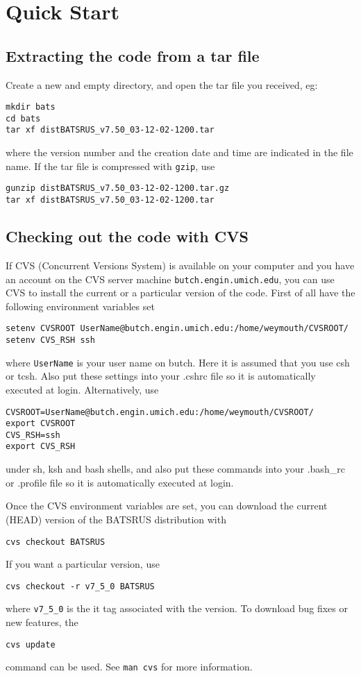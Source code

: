\section{Quick Start \label{section:quick_start}}

\subsection{Extracting the code from a tar file}

Create a new and empty directory, and open the tar file you received, eg:
\begin{verbatim}
mkdir bats
cd bats
tar xf distBATSRUS_v7.50_03-12-02-1200.tar  
\end{verbatim}
where the version number and the creation date and time are indicated
in the file name. If the tar file is compressed with {\tt gzip}, use
\begin{verbatim}
gunzip distBATSRUS_v7.50_03-12-02-1200.tar.gz
tar xf distBATSRUS_v7.50_03-12-02-1200.tar
\end{verbatim}

\subsection{Checking out the code with CVS}

If CVS (Concurrent Versions System) is available on your computer
and you have an account on the CVS server machine 
{\tt butch.engin.umich.edu}, you can use CVS to install
the current or a particular version of the code.
First of all have the following environment variables set
\begin{verbatim}
setenv CVSROOT UserName@butch.engin.umich.edu:/home/weymouth/CVSROOT/
setenv CVS_RSH ssh
\end{verbatim}
where {\tt UserName} is your user name on butch. Here it is assumed
that you use csh or tcsh. Also put these settings into your .cshrc file
so it is automatically executed at login. Alternatively, use
\begin{verbatim}
CVSROOT=UserName@butch.engin.umich.edu:/home/weymouth/CVSROOT/
export CVSROOT
CVS_RSH=ssh
export CVS_RSH
\end{verbatim}
under sh, ksh and bash shells, and also put these commands into your 
.bash\_rc or .profile file so it is automatically executed at login.

Once the CVS environment variables are set, you can download the
current (HEAD) version of the BATSRUS distribution with
\begin{verbatim}
cvs checkout BATSRUS
\end{verbatim}
If you want a particular version, use
\begin{verbatim}
cvs checkout -r v7_5_0 BATSRUS
\end{verbatim}
where {\tt v7\_5\_0} is the {it tag} associated with the version.
To download bug fixes or new features, the 
\begin{verbatim}
cvs update
\end{verbatim}
command can be used. See {\tt man cvs} for more information.

